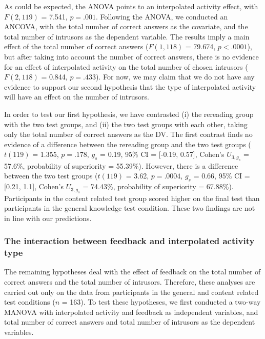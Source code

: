 \documentclass[../main.tex]{subfiles}
\begin{document}
As could be expected, the ANOVA points to an interpolated activity
effect, with \(F(2, 119)\) = 7.541, \(p = .001\). Following the ANOVA,
we conducted an ANCOVA, with the total number of correct answers as the
covariate, and the total number of intrusors as the dependent variable.
The results imply a main effect of the total number of correct answers
(\(F(1, 118)\) = 79.674, \(p < .0001\)), but after taking into account
the number of correct answers, there is no evidence for an effect of
interpolated activity on the total number of chosen intrusors
(\(F (2, 118)\) = 0.844, \(p = .433\)). For now, we may claim that we do
not have any evidence to support our second hypothesis that the type of
interpolated activity will have an effect on the number of intrusors.

In order to test our first hypothesis, we have contrasted (i) the
rereading group with the two test groups, and (ii) the two test groups
with each other, taking only the total number of correct answers as the
DV. The first contrast finds no evidence of a difference between the
rereading group and the two test groups (\(t(119)\) = 1.355,
\(p = .178\), \(g_s\) = 0.19, 95\% CI = {[}-0.19, 0.57{]}, Cohen's
\(U_{3, g_s}\) = 57.6\%, probability of superiority = 55.39\%). However,
there is a difference between the two test groups (\(t(119)\) = 3.62,
\(p = .0004\), \(g_s\) = 0.66, 95\% CI = {[}0.21, 1.1{]}, Cohen's
\(U_{3, g_s}\) = 74.43\%, probability of superiority = 67.88\%).
Participants in the content related test group scored higher on the
final test than participants in the general knowledge test condition.
These two findings are not in line with our predictions.

\hypertarget{the-interaction-between-feedback-and-interpolated-activity-type}{%
\subsubsection{The interaction between feedback and interpolated
activity
type}\label{the-interaction-between-feedback-and-interpolated-activity-type}}

The remaining hypotheses deal with the effect of feedback on the total
number of correct answers and the total number of intrusors. Therefore,
these analyses are carried out only on the data from participants in the
general and content related test conditions (\(n\) = 163). To test these
hypotheses, we first conducted a two-way MANOVA with interpolated
activity and feedback as independent variables, and total number of
correct answers and total number of intrusors as the dependent
variables.
\end{document}
